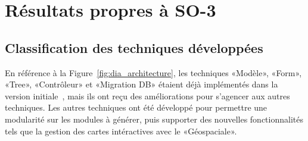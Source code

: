 \section{Résultats propres à SO-3}

\subsection{Classification des techniques développées}\label{result_technique_developpe}

En référence à la Figure~\ref{fig:dia_architecture}, les techniques «Modèle», «Form», «Tree», «Contrôleur» et «Migration DB» étaient déjà implémentés dans la version initiale~\cite{bluiksnot_repo}, mais ils ont reçu des améliorations pour s’agencer aux autres techniques. Les autres techniques ont été développé pour permettre une modularité sur les modules à générer, puis supporter des nouvelles fonctionnalités tels que la gestion des cartes intéractives avec le «Géospaciale».



